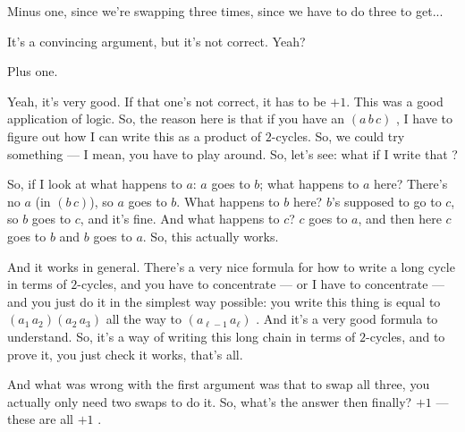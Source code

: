 \begin{student}
Minus one, since we're swapping three times, since we have to do three  to get...
\end{student}

\begin{speech}[00:34:33 - 00:34:40]
It's a convincing argument, but it's not correct. Yeah?
\end{speech}

\begin{student}
Plus one.
\end{student}

\begin{speech}[00:34:41 - 00:36:21]
Yeah, it's very good. If that one's not correct, it has to be $+1$. This was a good application of logic. So, the reason here is that if you have an $(a\,b\,c)$ , I have to figure out how I can write this as a product of $2$-cycles. So, we could try something --- I mean, you have to play around. So, let's see: what if I write that ?

So, if I look at what happens to $a$: $a$ goes to $b$; what happens to $a$ here? There's no $a$ (in $(b\,c)$), so $a$ goes to $b$. What happens to $b$ here? $b$'s supposed to go to $c$, so $b$ goes to $c$, and it's fine. And what happens to $c$? $c$ goes to $a$, and then here $c$ goes to $b$ and $b$ goes to $a$. So, this actually works.

And it works in general. There's a very nice formula for how to write a long cycle in terms of $2$-cycles, and you have to concentrate --- or I have to concentrate --- and you just do it in the simplest way possible: you write this thing is equal to $(a_1\,a_2)(a_2\,a_3)$ all the way to $(a_{\ell-1}\,a_\ell)$ . And it's a very good formula to understand. So, it's a way of writing this long chain in terms of $2$-cycles, and to prove it, you just check it works, that's all.

And what was wrong with the first argument was that to swap all three, you actually only need two swaps to do it. So, what's the answer then finally? $+1$ --- these are all $+1$ .
\end{speech}

